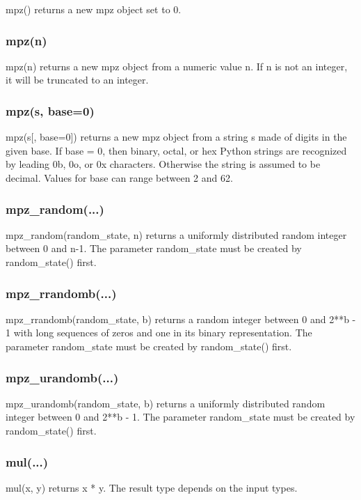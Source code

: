 mpz() returns a new mpz object set to 0.

\subsubsection{mpz(n) }
mpz(n) returns a new mpz object from a numeric value n. If n is not an integer, it will be
truncated to an integer.

\subsubsection{mpz(s, base=0)}
mpz(s[, base=0]) returns a new mpz object from a string s made of digits in the given base. If
base = 0, then binary, octal, or hex Python strings are recognized by leading 0b, 0o, or 0x
characters. Otherwise the string is assumed to be decimal. Values for base can range
between 2 and 62.

\subsubsection{mpz\_random(...)}

mpz\_random(random\_state, n) returns a uniformly distributed random integer between 0 and
n-1. The parameter random\_state must be created by random\_state() first.

\subsubsection{mpz\_rrandomb(...)}

mpz\_rrandomb(random\_state, b) returns a random integer between 0 and 2**b - 1 with long
sequences of zeros and one in its binary representation. The parameter random\_state must
be created by random\_state() first.

\subsubsection{mpz\_urandomb(...)}

mpz\_urandomb(random\_state, b) returns a uniformly distributed random integer between 0 and
2**b - 1. The parameter random\_state must be created by random\_state() first.

\subsubsection{mul(...)}

mul(x, y) returns x * y. The result type depends on the input types.


